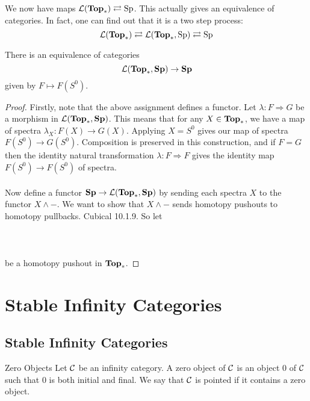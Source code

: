 \documentclass[a4paper]{article}
\begin{document}
We now have maps $\mathcal{L}(\bold{Top}_\ast)\rightleftarrows\text{Sp}$. This actually gives an equivalence of categories. In fact, one can find out that it is a two step process: $$\mathcal{L}(\bold{Top}_\ast)\rightleftarrows\mathcal{L}(\bold{Top}_\ast,\text{Sp})\rightleftarrows\text{Sp}$$

\begin{thm}{}{} There is an equivalence of categories $$\mathcal{L}(\bold{Top}_\ast,\bold{Sp})\to\bold{Sp}$$ given by $F\mapsto F(S^0)$. \tcbline
\begin{proof}
Firstly, note that the above assignment defines a functor. Let $\lambda:F\Rightarrow G$ be a morphism in $\mathcal{L}(\bold{Top}_\ast,\bold{Sp})$. This means that for any $X\in\bold{Top}_\ast$, we have a map of spectra $\lambda_X:F(X)\to G(X)$. Applying $X=S^0$ gives our map of spectra $F(S^0)\to G(S^0)$. Composition is preserved in this construction, and if $F=G$ then the identity natural transformation $\lambda:F\Rightarrow F$ gives the identity map $F(S^0)\to F(S^0)$ of spectra. \\~\\

Now define a functor $\bold{Sp}\to\mathcal{L}(\bold{Top}_\ast,\bold{Sp})$ by sending each spectra $X$ to the functor $X\wedge -$. We want to show that $X\wedge -$ sends homotopy pushouts to homotopy pullbacks. Cubical 10.1.9. So let \\~\\
\\~\\
be a homotopy pushout in $\bold{Top}_\ast$. 
\end{proof}
\end{thm}



\pagebreak
\section{Stable Infinity Categories}
\subsection{Stable Infinity Categories}
\begin{defn}{Zero Objects}{} Let $\mathcal{C}$ be an infinity category. A zero object of $\mathcal{C}$ is an object $0$ of $\mathcal{C}$ such that $0$ is both initial and final. We say that $\mathcal{C}$ is pointed if it contains a zero object. 
\end{defn}
\end{document}
